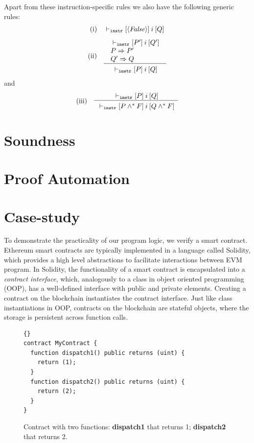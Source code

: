 \documentclass[sigplan,10pt,review]{acmart}\settopmatter{printfolios=true,printccs=false,printacmref=false}
\newcommand{\subpred}{\Rightarrow}
\newcommand{\sconj}{\wedge^*}
\newcommand{\ttrip}[5]{\mathit{#1} \vdash_{\mathrm{#2}}[#3]\:#4\:[#5]}
\newcommand{\pure}[1]{\langle#1\rangle}
\newcommand{\RuleC}[2]{\begin{array}{c}#1\\\hline\noalign{\smallskip}#2\end{array}}
\begin{document}
Apart from these instruction-specific rules we also have the following generic rules:
\[
\begin{array}{l l}
\mbox{(i)} & \ttrip{}{\mathtt{instr}}{\pure{\mathit{False}}}{i}{Q} 
\end{array}
\]
\[
\begin{array}{l l}
\mbox{(ii)} & \RuleC{\begin{array}{l}
                     \ttrip{}{\mathtt{instr}}{P'}{i}{Q'} \\
                     P \subpred P' \\ 
                     Q' \subpred Q
                     \end{array}}{\ttrip{}{\mathtt{instr}}{P}{i}{Q}}
\end{array}
\]
and
\[
\begin{array}{l l}
\mbox{(iii)} & \RuleC{\ttrip{}{\mathtt{instr}}{P}{i}{Q}}{\ttrip{}{\mathtt{instr}}{P \sconj F}{i}{Q \sconj F}}
\end{array}
\] 

\section{Soundness}
\label{sec:sound}


\section{Proof Automation}
\label{sec:auto}


\section{Case-study}
\label{sec:case}

To demonstrate the practicality of our program logic, we verify a smart contract.
Ethereum smart contracts are typically implemented in a language called Solidity,
which provides a high level abstractions to facilitate interactions between EVM
program.
In Solidity, the functionality of a smart contract is encapsulated into a
\textit{contract interface}, which, analogously to a class in object oriented programming
(OOP), has a well-defined interface with public and private elements.
Creating a contract on the blockchain instantiates the contract interface.
Just like class instantiations in OOP, contracts on the blockchain are
stateful objects, where the storage is persistent across function calls.

\begin{figure}[h!]
\begin{lstlisting}[language=Solidity]{}
contract MyContract {
  function dispatch1() public returns (uint) {
  	return (1);
  }
  function dispatch2() public returns (uint) {
  	return (2);
  }
}
\end{lstlisting}
\caption{Contract with two functions: \textbf{dispatch1} that returns 1; \textbf{dispatch2} that returns 2.}
\label{solidity}
\end{figure}
\end{document}
